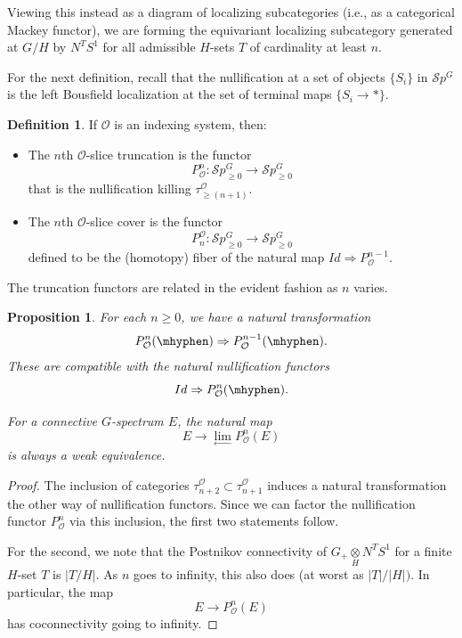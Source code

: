\documentclass{amsart}
\newcommand{\otimesover}[1]{\underset{#1}{\otimes}}
\newcommand{\cc}[1]{\mathcal #1}
\newcommand{\cO}{\cc{O}}
\newcommand{\Sp}{\mathcal Sp}
\numberwithin{equation}{section}
\newtheorem{proposition}[theorem]{Proposition}
\theoremstyle{remark}
\theoremstyle{definition}
\newtheorem{definition}[theorem]{Definition}
\begin{document}
Viewing this instead as a diagram of localizing subcategories (i.e., as a categorical Mackey functor), we are forming the equivariant localizing subcategory generated at \(G/H\) by \(N^T S^1\) for all admissible \(H\)-sets \(T\) of cardinality at least \(n\).

For the next definition, recall that the nullification at a set of objects $\{S_i\}$ in $\Sp^G$ is the left Bousfield localization at the set of terminal maps $\{S_i \to \ast\}$.

\begin{definition}
    If \(\cO\) is an indexing system, then:
    \begin{itemize}

    \item The \(n\)th \(\cO\)-slice truncation is the functor
    \[
        P^n_{\cO}\colon \Sp^G_{\geq 0}\to\Sp^G_{\geq 0}
    \]
    that is the nullification killing \(\tau_{\geq (n+1)}^{\cO}\). 

\item The \(n\)th \(\cO\)-slice cover is the functor
\[
P_n^{\cO}\colon \Sp^G_{\geq 0}\to\Sp^G_{\geq 0}
\]
defined to be the (homotopy) fiber of the natural map \(Id\Rightarrow P^{n-1}_{\cO}\). 
\end{itemize}
\end{definition}

The truncation functors are related in the evident fashion as $n$ varies.

\begin{proposition}
    For each \(n\geq 0\), we have a natural transformation 
    \[
    P^n_{\cO}(\mhyphen)\Rightarrow P^{n-1}_{\cO}(\mhyphen).
    \]
    These are compatible with the natural nullification functors 
    \[
    Id\Rightarrow P^n_{\cO}(\mhyphen).
    \]
    
    For a connective $G$-spectrum $E$, the natural map 
    \[
        E\to \lim_{\longleftarrow} P^n_{\cO}(E)
    \]
    is always a weak equivalence.
\end{proposition}
\begin{proof}
    The inclusion of categories \(\tau_{n+2}^{\cO}\subset\tau_{n+1}^{\cO}\) induces a natural transformation the other way of nullification functors.  Since we can factor the nullification functor \(P^n_{\cO}\) via this inclusion, the first two statements follow.
    
    For the second, we note that the Postnikov connectivity of \(G_+\otimesover{H} N^T S^1\) for a finite \(H\)-set $T$ is \(|T/H|\). As \(n\) goes to infinity, this also does (at worst as \(|T|/|H|)\). In particular, the map
    \[
        E\to P^n_\cO(E)
    \]
    has coconnectivity going to infinity.
\end{proof}
\end{document}
